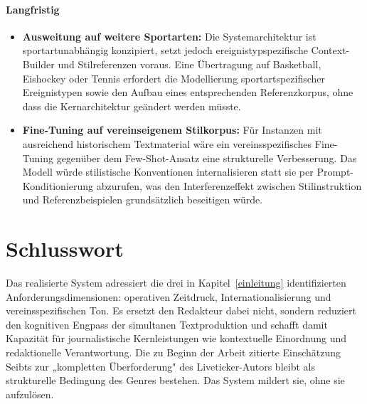 \paragraph{Langfristig}
\begin{itemize}\tightlist
\item \textbf{Ausweitung auf weitere Sportarten:} Die Systemarchitektur ist sportartunabhängig konzipiert, setzt jedoch ereignistypspezifische Context-Builder und Stilreferenzen voraus. Eine Übertragung auf Basketball, Eishockey oder Tennis erfordert die Modellierung sportartspezifischer Ereignistypen sowie den Aufbau eines entsprechenden Referenzkorpus, ohne dass die Kernarchitektur geändert werden müsste.
\item \textbf{Fine-Tuning auf vereinseigenem Stilkorpus:} Für Instanzen mit ausreichend historischem Textmaterial wäre ein vereinsspezifisches Fine-Tuning gegenüber dem Few-Shot-Ansatz eine strukturelle Verbesserung. Das Modell würde stilistische Konventionen internalisieren statt sie per Prompt-Konditionierung abzurufen, was den Interferenzeffekt zwischen Stilinstruktion und Referenzbeispielen grundsätzlich beseitigen würde.
\end{itemize}



\section{Schlusswort}\label{schlusswort}

Das realisierte System adressiert die drei in Kapitel~\ref{einleitung} identifizierten Anforderungsdimensionen: operativen Zeitdruck, Internationalisierung und vereinsspezifischen Ton. Es ersetzt den Redakteur dabei nicht, sondern reduziert den kognitiven Engpass der simultanen Textproduktion und schafft damit Kapazität für journalistische Kernleistungen wie kontextuelle Einordnung und redaktionelle Verantwortung. Die zu Beginn der Arbeit zitierte Einschätzung Seibts zur „kompletten Überforderung" \cite{beils2023} des Liveticker-Autors bleibt als strukturelle Bedingung des Genres bestehen. Das System mildert sie, ohne sie aufzulösen.
